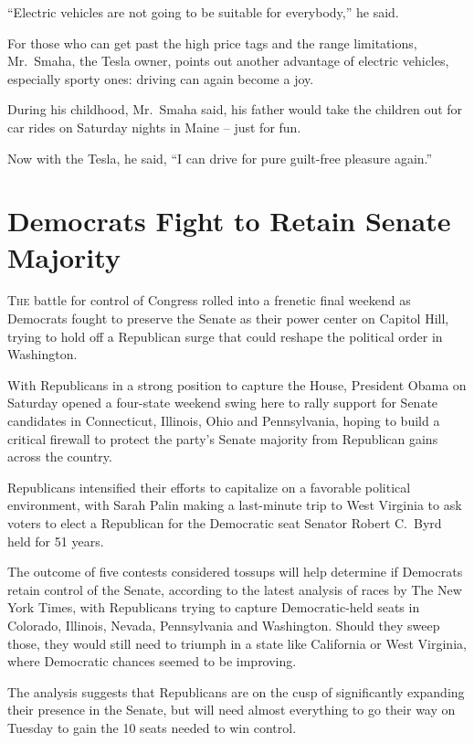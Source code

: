 ﻿\documentclass[12pt]{article}
\begin{document}
``Electric vehicles are not going to be suitable for everybody,'' he said.

For those who can get past the high price tags and the range limitations, Mr.~Smaha, the Tesla
owner, points out another advantage of electric vehicles, especially sporty ones: driving can again
become a joy.

During his childhood, Mr.~Smaha said, his father would take the children out for car rides on
Saturday nights in Maine -- just for fun.

Now with the Tesla, he said, ``I can drive for pure guilt-free pleasure again.''

\section{Democrats Fight to Retain Senate Majority}

\lettrine{T}{he} battle for control of Congress rolled into a frenetic final
weekend as Democrats fought to preserve the Senate as their power center on Capitol Hill, trying to
hold off a Republican surge that could reshape the political order in Washington.

With Republicans in a strong position to capture the House, President Obama on Saturday opened a
four-state weekend swing here to rally support for Senate candidates in Connecticut, Illinois, Ohio
and Pennsylvania, hoping to build a critical firewall to protect the party's Senate majority from
Republican gains across the country.

Republicans intensified their efforts to capitalize on a favorable political environment, with Sarah
Palin making a last-minute trip to West Virginia to ask voters to elect a Republican for the
Democratic seat Senator Robert C.~Byrd held for 51 years.

The outcome of five contests considered tossups will help determine if Democrats retain control of
the Senate, according to the latest analysis of races by The New York Times, with Republicans trying
to capture Democratic-held seats in Colorado, Illinois, Nevada, Pennsylvania and Washington. Should
they sweep those, they would still need to triumph in a state like California or West Virginia,
where Democratic chances seemed to be improving.

The analysis suggests that Republicans are on the cusp of significantly expanding their presence in
the Senate, but will need almost everything to go their way on Tuesday to gain the 10 seats needed
to win control.
\end{document}
